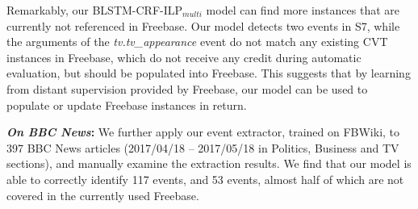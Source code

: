 Remarkably, our BLSTM-CRF-ILP$_{multi}$ model can find more \CVT instances that are currently not referenced in Freebase. Our model detects two events in S7, while the arguments of the \textit{tv.tv\_appearance} event do not match any existing CVT instances in Freebase, which do not receive any credit during automatic evaluation, but should be populated into Freebase. %
This  suggests that by learning from distant supervision provided by Freebase, our model can be used to populate or update Freebase instances in return.


\vspace{2mm}\noindent\textbf{\emph{On BBC News}:}
We further apply our event extractor, trained on FBWiki, to 397 BBC News
articles (2017/04/18 -- 2017/05/18 in Politics, Business and TV sections), and manually examine the extraction results. We find that our model is able to correctly identify 117 events, and 53 events,
almost half of which are not covered in the currently used Freebase.



